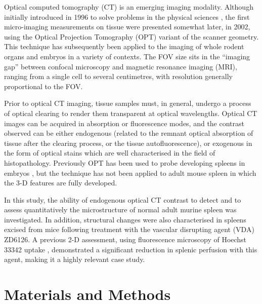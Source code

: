 \documentclass[12pt]{article}
\begin{document}
Optical computed tomography (CT) is an emerging imaging modality. Although initially introduced in 1996 to solve problems in the physical sciences \cite{goreradiation1996, winfreequantitative1996}, the first micro-imaging measurements on tissue were presented somewhat later, in 2002, using the Optical Projection Tomography (OPT) variant of the scanner geometry. \cite{sharpeoptical2002} This technique has subsequently been applied to the imaging of whole rodent organs and embryos in a variety of contexts. \cite{oldhamthree-dimensional2007, sharpeoptical2003}  The FOV size sits in the ``imaging gap'' between confocal microscopy and magnetic resonance imaging (MRI), ranging from a single cell to several centimetres, with resolution generally proportional to the FOV.

Prior to optical CT imaging, tissue samples must, in general, undergo a process of optical clearing to render them transparent at optical wavelengths. \cite{oldhamoptical2008, zhurecent2013}  Optical CT images can be acquired in absorption or fluorescence modes, and the contrast observed can be either endogenous (related to the remnant optical absorption of tissue after the clearing process, or the tissue autofluorescence), or exogenous in the form of optical stains which are well characterised in the field of histopathology. Previously OPT has been used to probe developing spleens in embryos \cite{asayeshspleen2006, hecksher2004splanchnic}, but the technique has not been applied to adult mouse spleen in which the 3-D features are fully developed.

In this study, the ability of endogenous optical CT contrast to detect and to assess quantitatively the microstructure of normal adult murine spleen was investigated. In addition, structural changes were also characterised in spleens excised from mice following treatment with the vascular disrupting agent (VDA) ZD6126. A previous 2-D assessment, using fluorescence microscopy of Hoechst 33342 uptake \cite{cullistumour2006}, demonstrated a significant reduction in splenic perfusion with this agent, making it a highly relevant case study.

\section{Materials and Methods}
\end{document}
